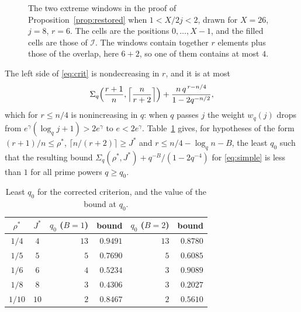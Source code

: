 \documentclass[11pt,a4paper]{amsart}
\theoremstyle{remark}
\numberwithin{equation}{section}
\begin{document}
\begin{figure}[ht]
\centering
{}
\caption{The two extreme windows in the proof of Proposition~\ref{prop:restored} when $1<X/2j<2$, drawn for $X=26$,
$j=8$, $r=6$. The cells are the positions $0,\dots,X-1$, and the filled cells are those of $\mathcal I$. The
windows contain together $r$ elements plus those of the overlap, here $6+2$, so one of them contains at most $4$.}
\label{fig:window}
\end{figure}

The left side of \eqref{eq:crit} is nondecreasing in $r$, and it is at most
\begin{equation}\label{eq:simple}
\Sigma_q\Bigl(\frac{r+1}n,\Bigl\lceil\frac n{r+2}\Bigr\rceil\Bigr)+\frac{n\,q^{\,r-n/4}}{1-2q^{-n/2}},
\end{equation}
which for $r\le n/4$ is nonincreasing in $q$: when $q$ passes $j$ the weight $w_q(j)$ drops from
$e^\gamma(\log_qj+1)>2e^\gamma$ to $e<2e^\gamma$. Table~\ref{tab:restored} gives,
for hypotheses of the form $(r+1)/n\le\rho^*$, $\lceil n/(r+2)\rceil\ge J^*$ and $r\le n/4-\log_qn-B$, the least
$q_0$ such that the resulting bound $\Sigma_q(\rho^*,J^*)+q^{-B}/(1-2q^{-4})$ for \eqref{eq:simple} is less than $1$ for all prime
powers $q\ge q_0$.

\begin{table}[ht]
\centering
\caption{Least $q_0$ for the corrected criterion, and the value of the bound at $q_0$.}\label{tab:restored}
\small
\begin{tabular}{@{}ccrrrr@{}}
\toprule
$\rho^*$ & $J^*$ & $q_0$ ($B=1$) & bound & $q_0$ ($B=2$) & bound\\
\midrule
$1/4$ & $4$ & $13$ & $0.9491$ & $13$ & $0.8780$\\
$1/5$ & $5$ & $5$ & $0.7690$ & $5$ & $0.6085$\\
$1/6$ & $6$ & $4$ & $0.5234$ & $3$ & $0.9089$\\
$1/8$ & $8$ & $3$ & $0.4306$ & $3$ & $0.2027$\\
$1/10$ & $10$ & $2$ & $0.8467$ & $2$ & $0.5610$\\
\bottomrule
\end{tabular}
\end{table}
\end{document}
